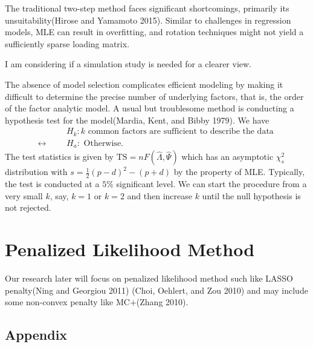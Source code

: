 \documentclass[
  12pt,
]{amsart}
\begin{document}
The traditional two-step method faces significant shortcomings,
primarily its unsuitability(Hirose and Yamamoto 2015). Similar to
challenges in regression models, MLE can result in overfitting, and
rotation techniques might not yield a sufficiently sparse loading
matrix.

I am considering if a simulation study is needed for a clearer view.

The absence of model selection complicates efficient modeling by making
it difficult to determine the precise number of underlying factors, that
is, the order of the factor analytic model. A usual but troublesome
method is conducting a hypothesis test for the model(Mardia, Kent, and
Bibby 1979). We have \begin{align*}
  &&&H_k: k \text{ common factors are sufficient to describe the data } \\
  \longleftrightarrow &&&H_a: \text{ Otherwise}.
\end{align*} The test statistics is given by
\(\text{TS}=nF(\hat{\Lambda},\hat{\Psi})\) which has an asymptotic
\(\chi^2_s\) distribution with \(s=\frac{1}{2}(p-d)^2-(p+d)\) by the
property of MLE. Typically, the test is conducted at a \(5\%\)
significant level. We can start the procedure from a very small \(k\),
say, \(k=1\) or \(k=2\) and then increase \(k\) until the null
hypothesis is not rejected.

\section{Penalized Likelihood Method}\label{penalized-likelihood-method}

Our research later will focus on penalized likelihood method such like
LASSO penalty(Ning and Georgiou 2011) (Choi, Oehlert, and Zou 2010) and
may include some non-convex penalty like MC+(Zhang 2010).

\subsection{Appendix}\label{appendix}
\end{document}
